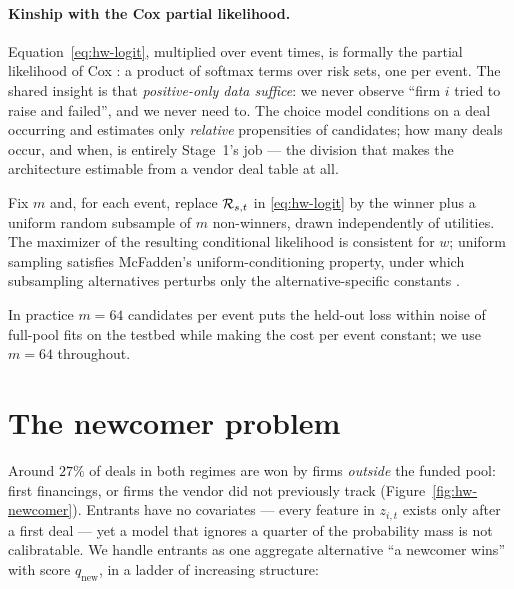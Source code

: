 \paragraph{Kinship with the Cox partial likelihood.}
Equation~\eqref{eq:hw-logit}, multiplied over event times, is formally the partial
likelihood of Cox \cite{cox1972}: a product of softmax terms over risk sets, one per
event. The shared insight is that \emph{positive-only data suffice}: we never observe
``firm $i$ tried to raise and failed'', and we never need to. The choice model conditions
on a deal occurring and estimates only \emph{relative} propensities of candidates; how
many deals occur, and when, is entirely Stage~1's job --- the division that makes the
architecture estimable from a vendor deal table at all.

\begin{proposition}
\label{prop:hw-sampled}
Fix $m$ and, for each event, replace $\mathcal{R}_{s,t}$ in \eqref{eq:hw-logit} by the winner plus
a uniform random subsample of $m$ non-winners, drawn independently of utilities. The
maximizer of the resulting conditional likelihood is consistent for $w$; uniform sampling
satisfies McFadden's uniform-conditioning property, under which subsampling alternatives
perturbs only the alternative-specific constants \cite{mcfadden1974}.
\end{proposition}

In practice $m = 64$ candidates per event puts the held-out loss within noise of full-pool
fits on the testbed while making the cost per event constant; we use $m=64$ throughout.

\section{The newcomer problem}
\label{sec:hw-newcomer}

Around $27\%$ of deals in both regimes are won by firms \emph{outside} the funded pool:
first financings, or firms the vendor did not previously track
(Figure~\ref{fig:hw-newcomer}). Entrants have no covariates --- every feature in
$z_{i,t}$ exists only after a first deal --- yet a model that ignores a quarter of the
probability mass is not calibratable. We handle entrants as one aggregate alternative
``a newcomer wins'' with score $q_{\mathrm{new}}$, in a ladder of increasing structure:

